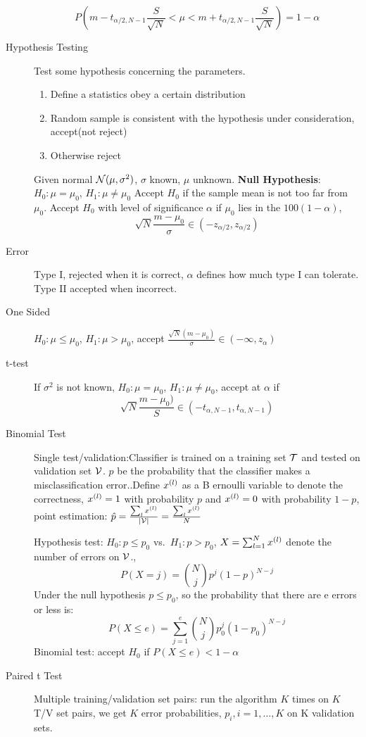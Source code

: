 \begin{description}
        \[P(m-t_{\alpha/2, N-1}\frac{S}{\sqrt{N}} < \mu < m + t_{\alpha/2,
        N-1}\frac{S}{\sqrt{N}}) = 1-\alpha\]
    \item[Hypothesis Testing] Test some hypothesis concerning the parameters.
        \begin{enumerate}
            \item Define a statistics obey a certain distribution
            \item Random sample is consistent with the hypothesis under
                consideration, accept(not reject)
            \item Otherwise reject
        \end{enumerate}
    Given normal $\mathcal{N}(\mu, \sigma^2)$, $\sigma$ known, $\mu$ unknown.
    \textbf{Null Hypothesis}:$H_0:\mu = \mu_0$, $H_1: \mu \neq \mu_0$
    Accept $H_0$ if the sample mean is not too far from $\mu_0$. Accept $H_0$
    with level of significance $\alpha$ if $\mu_0$ lies in the $100(1-\alpha)$,
    \[\sqrt{N}\frac{m-\mu_0}{\sigma}\in (-z_{\alpha/2}, z_{\alpha/2})\]
    \item[Error] Type I, rejected when it is correct, $\alpha$ defines how much type
        I can tolerate. Type II accepted when incorrect.
    \item[One Sided] $H_0: \mu\leq \mu_0$, $H_1: \mu > \mu_0$, accept
        $\frac{\sqrt{N}(m-\mu_0)}{\sigma} \in (-\infty, z_{\alpha})$
    \item[t-test] If $\sigma^2$ is not known, $H_0: \mu = \mu_0$, $H_1: \mu\neq
        \mu_0$, accept at $\alpha$ if \[\sqrt{N}\frac{m-\mu_0)}{S}\in
        (-t_{\alpha,N-1}, t_{\alpha, N-1}) \]
    \item[Binomial Test] 
        Single test/validation:Classifier is trained on a training set $\mathcal{T}$ and
        tested on validation set $\mathcal{V}$. $p$ be the probability that the
        classifier makes a misclassification error..Define $x^{(l)}$ as a B ernoulli
        variable to denote the correctness, $x^{(l)} =1$ with probability $p$ and
        $x^{(l)} =0$ with probability $1-p$, point estimation: $\hat{p} =
        \frac{\sum_l x^{(l)}}{|\mathcal{V}|} = \frac{\sum_l x^{(l)}}{N}$

        Hypothesis test: $H_0: p\leq p_0$ vs.\ $H_1: p> p_0$, $X = \sum_{l=1}^N x^{(l)}$
        denote the number of errors on $\mathcal{V}$., \[P(X=j) ={ N\choose{j}}
        p^j(1-p)^{N-j}\]
        Under the null hypothesis $p\leq p_0$, so the probability that there are
        e errors or less is:
        \[
        P(X\leq e) = \sum_{j=1}^e {N\choose{j}}p_0^j(1-p_0)^{N-j}\]
        Binomial test: accept $H_0$ if $P(X\leq e)<1-\alpha$
    \item[Paired t Test] Multiple training/validation set pairs: run the
        algorithm $K$ times on $K$ T/V set pairs, we get $K$ error
        probabilities, $p_i, i = 1, \dots, K$ on K validation sets.


\end{description}
